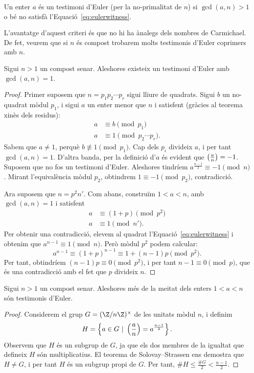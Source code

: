 \begin{definition}
Un enter $a$ és un testimoni d'Euler (per la no-primalitat de $n$) si $\gcd(a,n)>1$ o bé no satisfà l'Equació~\eqref{eq:eulerwitness}.
\end{definition}

L'avantatge d'aquest criteri és que no hi ha ànalegs dels nombres de Carmichael. De fet, veurem que si $n$ és compost trobarem molts testimonis d'Euler coprimers amb $n$.

\begin{theorem}
Sigui $n>1$ un compost senar. Aleshores existeix un testimoni d'Euler amb $\gcd(a,n)=1$.
\end{theorem}
\begin{proof}
Primer suposem que $n=p_1p_2\cdots p_r$ sigui lliure de quadrats. Sigui $b$ un no-quadrat mòdul $p_1$, i sigui $a$ un enter menor que $n$ i satisfent (gràcies al teorema xinès dels residus):
\begin{align*}
    a &\equiv b\pmod {p_1}\\
    a &\equiv 1\pmod {p_2\cdots p_r}.
\end{align*}
Sabem que $a\neq 1$, perquè $b\not\equiv 1\pmod {p_1}$. Cap dels $p_i$ divideix $a$, i per tant $\gcd(a,n)=1$. D'altra banda, per la definició d'$a$ és evident que $\left(\frac{a}{n}\right)=-1$. Suposem que no fos un testimoni d'Euler. Aleshores tindríem $a^\frac{n-1}{2}\equiv -1\pmod n$. Mirant l'equivalència mòdul $p_2$, obtindrem $1\equiv -1\pmod{p_2}$, contradicció.

Ara suposem que $n=p^2 n'$. Com abans, construïm $1<a<n$, amb $\gcd(a,n)=1$ i satisfent
\begin{align*}
a &\equiv (1+p)\pmod {p^2}\\
a &\equiv 1 \pmod {n'}.
\end{align*}
Per obtenir una contradicció, elevem al quadrat l'Equació~\eqref{eq:eulerwitness} i obtenim que $a^{n-1}\equiv 1\pmod n$. Però mòdul $p^2$ podem calcular:
\[
a^{n-1}\equiv (1+p)^{n-1} \equiv 1+ (n-1)p\pmod{p^2}.
\]
Per tant, obtindríem $(n-1)p\equiv 0\pmod {p^2}$, i per tant $n-1\equiv 0\pmod p$, que és una contradicció amb el fet que $p$ divideix $n$.
\end{proof}
\begin{corollary}
Sigui $n>1$ un compost senar. Aleshores més de la meitat dels enters $1<a<n$ són testimonis d'Euler.
\end{corollary}
\begin{proof}
Considerem el grup $G=(\Z/n\Z)^\times$ de les unitats mòdul $n$, i definim
\[
H = \left\{a\in G ~|~ \left(\frac{a}{n}\right) = a^{\frac{n-1}{2}}\right\}.
\]
Observem que $H$ és un subgrup de $G$, ja que els dos membres de la igualtat que defineix $H$ són multiplicatius. El teorema de Solovay--Strassen ens demostra que $H\neq G$, i per tant $H$ és un subgrup propi de $G$. Per tant, $\# H \leq \frac{\# G}2 < \frac{n-1}{2}$.
\end{proof}

